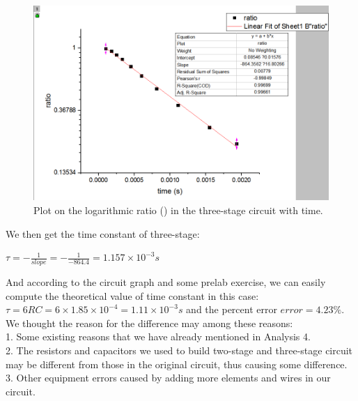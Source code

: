 \begin{figure}[!htbp]
	\centering %
	\includegraphics[width=\linewidth]{images/2_8.PNG} %
	\caption{Plot on the logarithmic ratio ({\tiny }) in the three-stage circuit with time.} %
	\label{fig:2.8} %
\end{figure}
\phantom{ } We then get the time constant of three-stage: 
\begin{center}
	$\tau = -\frac{1}{slope} = -\frac{1}{-864.4} = 1.157\times10^{-3}s$
\end{center}

And according to the circuit graph and some prelab exercise, we can easily compute
the theoretical value of time constant in this case:
$\tau = 6RC = 6\times1.85\times10^{-4} = 1.11\times10^{-3}s$ and the percent error $error = 4.23\%$.\\
\phantom{ } We thought the reason for the difference may among these reasons:\\
1. Some existing reasons that we have already mentioned in Analysis 4.\\
2. The resistors and capacitors we used to build two-stage and three-stage circuit may be different from those in the original circuit, thus causing some difference.\\
3. Other equipment errors caused by adding more elements and wires in our circuit.\\

